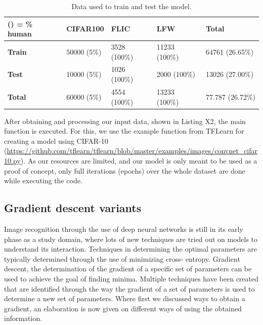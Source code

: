 \begin{table}[h]
	\centering
	\caption{Data used to train and test the model. \label{tab:data}}
	\begin{tabular}{|l|llll}
		\hline
		\textbf{() = \% human} & \multicolumn{1}{l|}{\textbf{CIFAR100}} & \multicolumn{1}{l|}{\textbf{FLIC}} & \multicolumn{1}{l|}{\textbf{LFW}} & \multicolumn{1}{l|}{\textbf{Total}} \\ \hline
		\textbf{Train}         & 50000 (5\%)                            & 3528 (100\%)                       & 11233 (100\%)                     & 64761 (26.65\%)                     \\ \cline{1-1}
		\textbf{Test}          & 10000 (5\%)                            & 1026 (100\%)                       & 2000 (100\%)                      & 13026 (27.00\%)                     \\ \cline{1-1}
		\textbf{Total}         & 60000 (5\%)                            & 4554 (100\%)                       & 13233 (100\%)                     & 77.787 (26.72\%)                    \\ \cline{1-1}
	\end{tabular}
\end{table}



After obtaining and processing our input data, shown in Listing X2, the main function is executed. For this, we use the example function from TFLearn for creating a model using CIFAR-10 (\url{https://github.com/tflearn/tflearn/blob/master/examples/images/convnet_cifar10.py}). As our resources are limited, and our model is only meant to be used as a proof of concept, only full iterations (epochs) over the whole dataset are done while executing the code.
\subsection{Gradient descent variants \label{subsec:gradient}}
Image recognition through the use of deep neural networks is still in its early phase as a study domain, where lots of new techniques are tried out on models to understand its interaction. Techniques in determining the optimal parameters are typically determined through the use of minimizing cross- entropy. Gradient descent, the determination of the gradient of  a specific set of parameters can be used to achieve the goal of finding minima. Multiple techniques have been created that are identified through the way the gradient of a set of parameters is used to determine a new set of parameters. Where first we discussed ways to obtain a gradient, an elaboration is now given on different ways of using the obtained information.
